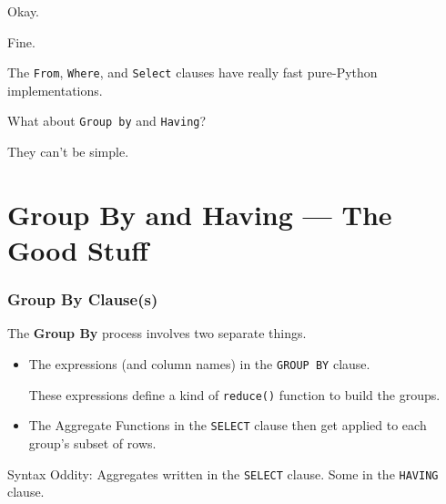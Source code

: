 \documentclass{beamer}
\begin{document}
\begin{frame}
    Okay.
    \vspace{1em}

    Fine.
    \vspace{1em}

    The \texttt{From}, \texttt{Where}, and \texttt{Select} clauses have really fast pure-Python implementations.
    \vspace{1em}

    What about \texttt{Group by} and \texttt{Having}?  \pause

    They can't be simple.
\end{frame}

\section{Group By and Having --- The Good Stuff}
\begin{frame}
    \frametitle{Group By Clause(s)}

    The \textbf{Group By} process involves two separate things.
    \begin{itemize}
        \item The expressions (and column names) in the \texttt{GROUP BY} clause.

        \vspace{0.8em}
        These expressions define a kind of \texttt{reduce()} function to build the groups.

        \vspace{1em}
        \item The Aggregate Functions in the \texttt{SELECT} clause then get applied to each group's subset of rows.
    \end{itemize}

    \vspace{1em}

    Syntax Oddity: Aggregates written in the \texttt{SELECT} clause.
    Some in the \texttt{HAVING} clause.

\end{frame}
\end{document}
